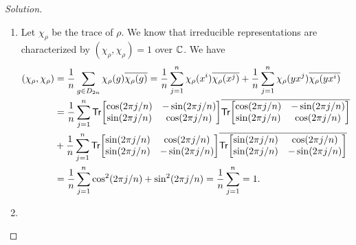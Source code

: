 \begin{proof}[Solution]
\begin{enumerate}[font=\normalfont,label=\textbf{(\alph*)}, wide]
\[\begin{aligned}
\begin{bmatrix}
-\sin(2\pi/n) & \cos(2\pi/n) \\
\cos(2\pi/n) & \sin(2\pi/n) 
\end{bmatrix}
\begin{bmatrix}
\cos(2\pi/n) & -\sin(2\pi/n) \\
\sin(2\pi/n) & \cos(2\pi/n)
\end{bmatrix}
\\
&=
\begin{bmatrix}
\cos^2(2\pi/n) + \sin^2(2\pi/n) & 0 \\
0 & \cos^2(2\pi/n) + \sin^2(2\pi/n)
\end{bmatrix}
\\
&=
\begin{bmatrix}
1 & 0 \\
0 & 1
\end{bmatrix}
.
\end{aligned}
\]
The first relation $\rho(x)^n = 1$ is indeed in one-to-one correspondence with the relation $x^n = 1$ since $n$ is the smallest non-negative integer $k$ such that $\cos(2\pi k/n), \sin(2\pi k/n) = 1, 0$ respectively which implies that $\rho(x)^k \neq 1$ for $k < n$.

\item Let $\chi_\rho$ be the trace of $\rho$. We know that irreducible representations are characterized by $(\chi_\rho, \chi_\rho) = 1$ over $\mathbb{C}$. We have
\[
\begin{aligned}
(\chi_\rho, \chi_\rho) &= \frac{1}{n}\sum_{g \in D_{2n}}  \chi_\rho(g)\overline{\chi_\rho(g)} = \frac{1}{n}\sum_{j = 1}^n  \chi_\rho(x^i)\overline{\chi_\rho(x^j)} + \frac{1}{n}\sum_{j = 1}^n  \chi_\rho(yx^j)\overline{\chi_\rho(yx^i)} \\
&= \frac{1}{n}\sum_{j = 1}^n 
\mathsf{Tr}{
\begin{bmatrix}
\cos(2\pi j/n) & -\sin(2\pi j/n) \\
\sin(2\pi j/n) & \cos(2\pi j/n)
\end{bmatrix}
}
\overline{
\mathsf{Tr}{
\begin{bmatrix}
\cos(2\pi j/n) & -\sin(2\pi j/n) \\
\sin(2\pi j/n) & \cos(2\pi j/n)
\end{bmatrix}
}
} \\
&+
\frac{1}{n}\sum_{j = 1}^n 
\mathsf{Tr}{
\begin{bmatrix}
\sin(2\pi j/n) & \cos(2\pi j/n) \\
\sin(2\pi j/n) & -\sin(2\pi j/n)
\end{bmatrix}
}
\overline{
\mathsf{Tr}{
\begin{bmatrix}
\sin(2\pi j/n) & \cos(2\pi j/n) \\
\sin(2\pi j/n) & -\sin(2\pi j/n)
\end{bmatrix}
}
} \\
&= \frac{1}{n} \sum_{j = 1}^n \cos^2(2\pi j/n) + \sin^2(2\pi j/n) = \frac{1}{n} \sum_{j = 1}^n = 1. 
\end{aligned}
\]

\item 
\end{enumerate}
\end{proof}

